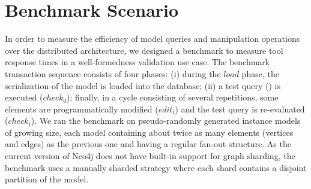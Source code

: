 \section{Benchmark Scenario}

\label{benchmark}
In order to measure the efficiency of model queries and manipulation operations over the distributed architecture, we designed a benchmark to measure tool response times in a well-formedness validation use case. The benchmark transaction sequence consists of four phases: (i) during the $\mathit{load}$ phase, the serialization of the model is loaded into the database; (ii) a test query () is executed ($\mathit{check}_0$); finally, in a cycle consisting of several repetitions, some elements are programmatically modified ($\mathit{edit}_i$) and the test query is re-evaluated ($\mathit{check}_i$). We ran the benchmark on pseudo-randomly generated instance models of growing size, each model containing about twice as many elements (vertices and edges) as the previous one and having a regular fan-out structure. As the current version of Neo4j does not have built-in support for graph sharding, the benchmark uses a manually sharded strategy where each shard contains a disjoint partition of the model.






